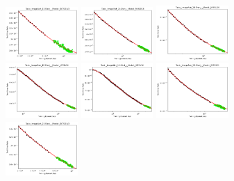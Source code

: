 \documentclass{article} %
\begin{document}
\begin{figure}
\includegraphics[width=0.245\textwidth]{figures/scaling_laws_benchmark_dataset_plots/few_shot_10___BiT_101_3.png}
\includegraphics[width=0.245\textwidth]{figures/scaling_laws_benchmark_dataset_plots/few_shot_10___MiX_B_16.png}
\includegraphics[width=0.245\textwidth]{figures/scaling_laws_benchmark_dataset_plots/few_shot_10___MiX_L_16.png}
\includegraphics[width=0.245\textwidth]{figures/scaling_laws_benchmark_dataset_plots/few_shot_10___ViT_B_16.png}
\includegraphics[width=0.245\textwidth]{figures/scaling_laws_benchmark_dataset_plots/few_shot_10___ViT_S_16.png}
\includegraphics[width=0.245\textwidth]{figures/scaling_laws_benchmark_dataset_plots/few_shot_25___BiT_50_1.png}
\includegraphics[width=0.245\textwidth]{figures/scaling_laws_benchmark_dataset_plots/few_shot_25___BiT_101_3.png}

\end{figure}
\end{document}
